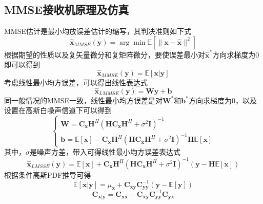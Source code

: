 \documentclass[bachelor,nocolorlinks, printoneside]{seuthesis} %
\begin{document}
\begin{Main}
\section{MMSE接收机原理及仿真}
MMSE估计是最小均放误差估计的缩写，其判决准则如下式
\begin{equation}\label{key}
\hat{\mathbf{x}}_{MMSE}(\mathbf{y}) = \arg \min \mathbb{E}[\| \mathbf{x} - \hat{\mathbf{x}} \|^{2}]
\end{equation}
根据期望的性质以及复矢量微分和复矩阵微分，要使误差最小对$\hat{\mathbf{x}}^{*}$方向求梯度为0即可以得到
\begin{equation}\label{key}
\hat{\mathbf{x}}_{MMSE}(\mathbf{y}) = \mathbb{E}[\mathbf{x}|\mathbf{y}]
\end{equation}
考虑线性最小均方误差，可以得出线性表达式
\begin{equation}\label{key}
\hat{\mathbf{x}}_{LMMSE}(\mathbf{y})=\mathbf{W}\mathbf{y}+\mathbf{b}
\end{equation}
同一般情况的MMSE一致，线性最小均方误差是对$\mathbf{W}^{*}$和$\mathbf{b}^{*}$方向求梯度为0，以及设置在高斯白噪声信道下可以得到
\begin{equation}\label{key}
\left\{
\begin{array}{l}
\mathbf{W}=\mathbf{C}_{\mathbf{x}}\mathbf{H}^{H}(\mathbf{H}\mathbf{C}_{\mathbf{x}}\mathbf{H}^{H} + \sigma^{2}\mathbf{I})^{-1} \\
\mathbf{b}=\mathbb{E}[\mathbf{x}] - \mathbf{C}_{\mathbf{x}}\mathbf{H}^{H}(\mathbf{H}\mathbf{C}_{\mathbf{x}}\mathbf{H}^{H} + \sigma^{2}\mathbf{I})^{-1}\mathbf{H}\mathbb{E}[\mathbf{x}]
\end{array}
\right.
\end{equation}
其中，$\sigma$是噪声方差，带入可得线性最小均方误差表达式
\begin{equation}\label{key}
\hat{\mathbf{x}}_{LMSSE}(\mathbf{y})=\mathbb{E}[\mathbf{x}]+\mathbf{C}_{\mathbf{x}}\mathbf{H}^{H}(\mathbf{H}\mathbf{C}_{\mathbf{x}}\mathbf{H}^{H}+\sigma^{2}\mathbf{I})^{-1}(\mathbf{y}-\mathbf{H}\mathbb{E}[\mathbf{x}])
\end{equation}
根据条件高斯PDF推导可得
\begin{equation}\label{key}
\mathbb{E}[\mathbf{x}|\mathbf{y}]=\mu_{\mathbf{x}}+\mathbf{C}_{\mathbf{x}\mathbf{y}}\mathbf{C}_{\mathbf{y}\mathbf{y}}^{-1}(\mathbf{y}-\mathbb{E}[\mathbf{y}])
\end{equation}
\begin{equation}\label{key}
\mathbf{C}_{\mathbf{x}|\mathbf{y}} = \mathbf{C}_{\mathbf{x}\mathbf{x}} -\mathbf{C}_{\mathbf{x}\mathbf{y}}\mathbf{C}_{\mathbf{y}\mathbf{y}}^{-1}\mathbf{C}_{\mathbf{y}\mathbf{x}}

\end{equation}
\end{Main}
\end{document}
